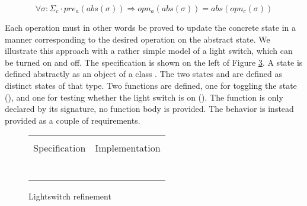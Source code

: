 \begin{equation} \label{eq:refinement}
\forall \sigma : \Sigma_c \cdot 
  pre_a(abs(\sigma)) \Rightarrow opn_a(abs(\sigma)) = abs(opn_c(\sigma))
\end{equation}

\noindent
Each operation must in other words be proved to update the concrete state
in a manner corresponding to the desired operation on the abstract state.
We illustrate this approach with a rather simple \Klang{} model of a light switch,
which can be turned on and off.  The specification is shown on the left of
Figure \ref{fig:lightswitch}. A state is defined abstractly as an object of 
a class . The two states  and  are defined as 
distinct states of that type. Two functions are defined, one for toggling
the state (), and one for testing whether the light switch is on
(). The  function is only declared by its signature, no 
function body is provided. The behavior is instead provided  as a couple of
requirements.

\begin{figure}
  \centering
  \begin{tabular}[c]{c|c}
    \hline \\
    Specification & Implementation \\
    \hline\hline \\ \\
    \begin{subfigure}[c]{0.5\textwidth}
     
      \label{fig:lightswitch1}
    \end{subfigure}
    &
    \begin{subfigure}[c]{0.5\textwidth}
      
      \label{fig:lightswicth2}
    \end{subfigure}
    \\ \\
    \hline
  \end{tabular}    
  \caption{Lightswitch refinement}
  \label{fig:lightswitch}
\end{figure}

